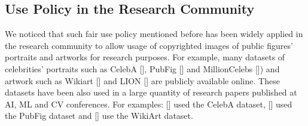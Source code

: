 \documentclass{article}
\begin{document}
\subsection{Use Policy in the Research Community}
We noticed that such fair use policy mentioned before has been widely applied in the research community to allow usage of copyrighted images of public figures' portraits and artworks for research purposes. For example, many datasets of celebrities' portraits such as CelebA [], PubFig [] and MillionCelebs []) and artwork such as Wikiart [] and LION [] are publicly available online. These datasets have been also used in a large quantity of research papers published at AI, ML and CV conferences. For examples: [] used the CelebA dataset, [] used the PubFig dataset and [] use the WikiArt dataset.
\end{document}

